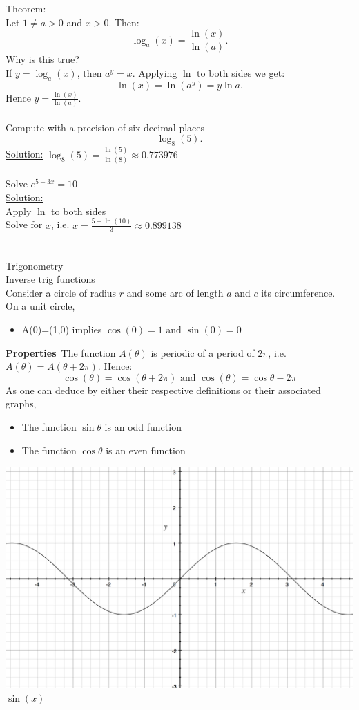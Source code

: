 \documentclass[]{article}
\begin{document}
	Theorem:\\
	Let $1\ne a>0$ and $x>0$. Then:
	$$\log_a(x)=\frac{\ln(x)}{\ln(a)}.$$
	Why is this true?\\
	If $y=\log_a(x)$, then $a^y=x$. Applying $\ln$ to both sides we get:
	$$
	\ln(x)=\ln(a^y)=y\ln a.
	$$
	Hence $y=\frac{\ln(x)}{\ln(a)}$.\\\\
	Compute with a precision of six decimal places
	$$
	\log_8(5).
	$$
	\underline{Solution:} $\log_8(5)=\frac{\ln(5)}{\ln(8)}\approx 0.773976$\\\\
	Solve $e^{5-3x}=10$\\
	\underline{Solution:}\\
	Apply $\ln$ to both sides\\
	Solve for $x$, i.e. $x=\frac{5-\ln(10)}{3}\approx 0.899138$\\\\
	\pagebreak\\
	\Large{Trigonometry}\\
	\large{Inverse trig functions}\\
	\normalsize
	Consider a circle of radius $r$ and some arc of length $a$ and $c$ its circumference.\\
	On a unit circle,
	\begin{itemize}
		\item A(0)=(1,0) implies $\cos(0)=1$ and $\sin(0)=0$
	\end{itemize}
	{\bf Properties}\
	The function $A(\theta)$ is periodic of a period of $2\pi$, i.e. $A(\theta)=A(\theta+2\pi)$. Hence:
	$$
	\cos(\theta)=\cos(\theta+2\pi)\text{ and }\cos(\theta)=\cos{\theta-2\pi}
	$$
	As one can deduce by either their respective definitions or their associated graphs,
	\begin{itemize}
		\item The function $\sin\theta$ is an odd function
		\item The function $\cos\theta$ is an even function
	\end{itemize}
	\begin{center}
		\includegraphics[scale=0.4]{./graphics/sinx.png}\\
		$\sin(x)$
	\end{center}
\end{document}
